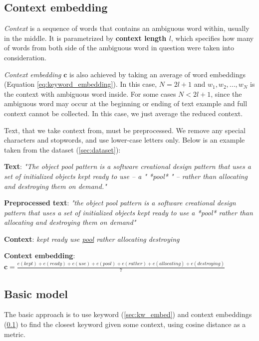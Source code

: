 \documentclass{llncs}
\begin{document}
\subsection{Context embedding}
\label{sec:ctx_embed}
\textit{Context} is a sequence of words that contains an ambiguous word within, usually in the middle.
It is parametrized by \textbf{context length \(l\)}, which specifies how many of words from both side of the ambiguous word in question were taken into consideration.

\textit{Context embedding} \(\bm{c}\) is also achieved by taking an average of word embeddings (Equation \ref{eq:keyword_embedding}).
In this case, \(N = 2l + 1\) and \(w_1, w_2, ..., w_N\) is the context with ambiguous word inside. For some cases \(N < 2l + 1\), since the ambiguous word may occur at the beginning or ending of text example and full context cannot be collected.
In this case, we just average the reduced context.

Text, that we take context from, must be preprocessed.
We remove any special characters and stopwords, and use lower-case letters only. Below is an example taken from the dataset (\ref{sec:dataset}):

\begin{tcolorbox}[
    colframe=blue!25,
    colback=white!10,
    coltitle=white!20!black,
    title={Example for keyword \textit{pool (computer science)} with context length \(l=3\)}]

\textbf{Text}:
\textit{"The object pool pattern is a software creational design pattern that uses a set of initialized objects kept ready to use – a " *pool* " – rather than allocating and destroying them on demand."}

\textbf{Preprocessed text}:
\textit{"the object pool pattern is a software creational design pattern that uses a set of initialized objects kept ready to use a *pool* rather than allocating and destroying them on demand"}

\textbf{Context}:
\textit{kept ready use \underline{pool} rather allocating destroying}

\textbf{Context embedding}:
\(\bm{c} = \frac{e(kept) + e(ready) + e(use) + e(pool) + e(rather) + e(allocating) + e(destroying)}{7}\)

\end{tcolorbox}

\subsection{Basic model}
\label{sec:basic_model}
The basic approach is to use keyword (\ref{sec:kw_embed}) and context embeddings (\ref{sec:ctx_embed}) to find the closest keyword given some context, using cosine distance as a metric.
\end{document}
